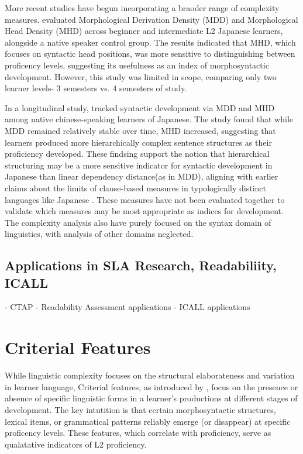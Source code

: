 More recent studies have begun incorporating a braoder range of complexity measures. \cite{komori2019} evaluated
Morphological Derivation Density (MDD) and Morphological Head Density (MHD) across beginner and intermediate L2
Japanese learners, alongside a native speaker control group. The results indicated that MHD, which focuses on
syntactic head positions, was more sensitive to distinguishing between proficency levels, suggesting its usefulness
as an index of morphosyntactic development. However, this study was limited in scope, comparing only two learner
levels- 3 semesters vs. 4 semesters of study.

In a longitudinal study, \cite{Yang2023} tracked syntactic development via MDD and MHD among native chinese-speaking
learners of Japanese. The study found that while MDD remained relatively stable over time, MHD increased, suggesting
that learners produced more hierarchically complex sentence structures as their proficiency developed. These
findsing support the notion that hierarchical structuring may be a more sensitive indicator for syntactic development
in Japanese than linear dependency distance(as in MDD), aligning with earlier claims about the limits of
clause-based measures in typologically distinct languages like Japanese \citep{Iwashita2006}. These measures have
not been evaluated together to validate which measures may be most appropriate as indices for development. The
complexity analysis also have purely focused on the syntax domain of linguistics, with
analysis of other domains neglected.

\subsection{Applications in SLA Research, Readabiliity, ICALL}
- CTAP
- Readability Assessment applications
- ICALL applications


\section{Criterial Features}

While linguistic complexity focuses on the structural elaborateness and variation in learner language, Criterial
features, as introduced
    by \citet{Hawkins_Buttery_2010}, focus on the
    presence or
    absence of specific linguistic forms in a learner's
    productions at different
    stages of development. The key intutition is that certain morphosyntactic structures, lexical items, or
grammatical patterns reliably emerge (or disappear) at specific proficency levels. These features, which correlate
with proficiency, serve as qualatative indicators of L2 proficiency.

